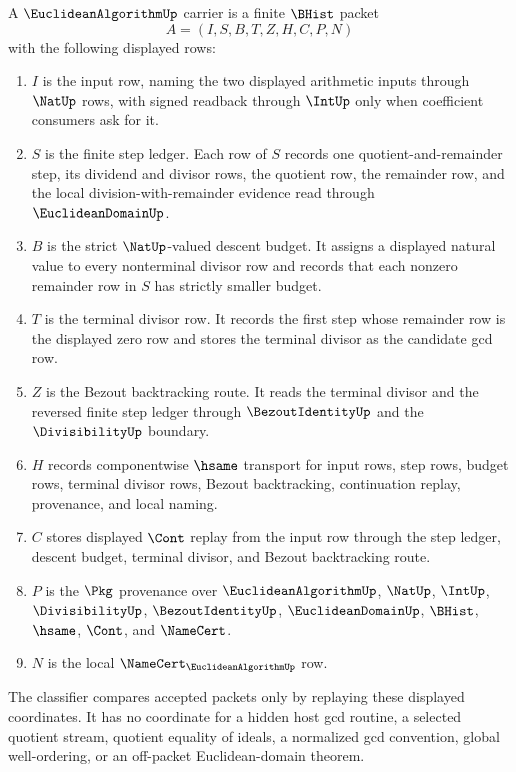 \begin{definition}
\label{def:euclidean-algorithm-carrier}
A $\EuclideanAlgorithmUp$ carrier is a finite $\BHist$ packet
$$
A=(I,S,B,T,Z,H,C,P,N)
$$
with the following displayed rows:
\begin{enumerate}
\item $I$ is the input row, naming the two displayed arithmetic inputs through $\NatUp$ rows, with signed readback through $\IntUp$ only when coefficient consumers ask for it.
\item $S$ is the finite step ledger. Each row of $S$ records one quotient-and-remainder step, its dividend and divisor rows, the quotient row, the remainder row, and the local division-with-remainder evidence read through $\EuclideanDomainUp$.
\item $B$ is the strict $\NatUp$-valued descent budget. It assigns a displayed natural value to every nonterminal divisor row and records that each nonzero remainder row in $S$ has strictly smaller budget.
\item $T$ is the terminal divisor row. It records the first step whose remainder row is the displayed zero row and stores the terminal divisor as the candidate gcd row.
\item $Z$ is the Bezout backtracking route. It reads the terminal divisor and the reversed finite step ledger through $\BezoutIdentityUp$ and the $\DivisibilityUp$ boundary.
\item $H$ records componentwise $\hsame$ transport for input rows, step rows, budget rows, terminal divisor rows, Bezout backtracking, continuation replay, provenance, and local naming.
\item $C$ stores displayed $\Cont$ replay from the input row through the step ledger, descent budget, terminal divisor, and Bezout backtracking route.
\item $P$ is the $\Pkg$ provenance over $\EuclideanAlgorithmUp$, $\NatUp$, $\IntUp$, $\DivisibilityUp$, $\BezoutIdentityUp$, $\EuclideanDomainUp$, $\BHist$, $\hsame$, $\Cont$, and $\NameCert$.
\item $N$ is the local $\NameCert_{\EuclideanAlgorithmUp}$ row.
\end{enumerate}
The classifier compares accepted packets only by replaying these displayed coordinates. It has no coordinate for a hidden host gcd routine, a selected quotient stream, quotient equality of ideals, a normalized gcd convention, global well-ordering, or an off-packet Euclidean-domain theorem.
\end{definition}

